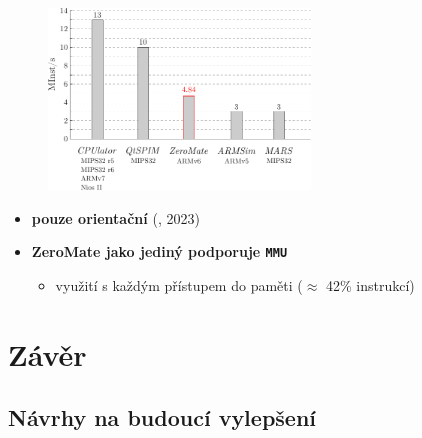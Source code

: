 \documentclass[compress]{beamer}
\begin{document}
\begin{frame}
	\vspace{-0.2cm}
	\begin{figure}
		\centering
		\includegraphics[width=0.62\textwidth]{img/performance_comparison.pdf}
	\end{figure}
	\vspace{-0.4cm}
	\noindent\makebox[\linewidth]{\rule{\textwidth}{0.4pt}}
	\vspace{-0.4cm}
	\begin{itemize}
		\item \textbf{pouze orientační} (\href{https://cpulator.01xz.net/}{}, 2023)
		\item \textbf{ZeroMate jako jediný podporuje \texttt{MMU}}
		\begin{itemize}
			\item využití s každým přístupem do paměti ($\approx$ 42\% instrukcí)
		\end{itemize}
	\end{itemize}
\end{frame}

\section{Závěr}

\subsection{Návrhy na budoucí vylepšení}
\end{document}
